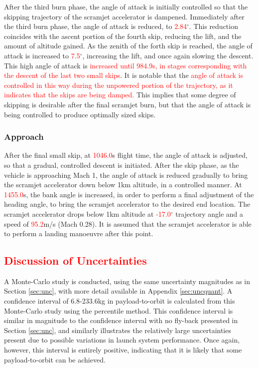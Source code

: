 After the third burn phase, the angle of attack is initially controlled so that the skipping trajectory of the scramjet accelerator is dampened.
Immediately after the third burn phase, the angle of attack is reduced, to \textcolor{red}{2.84}$^\circ$. This reduction coincides with the ascent portion of the fourth skip, reducing the lift, and the amount of altitude gained. 
As the zenith of the forth skip is reached, the angle of attack is increased to \textcolor{red}{7.5}$^\circ$, increasing the lift, and once again slowing the descent. 
This high angle of attack is \textcolor{red}{increased until 984.9s, in stages corresponding with the descent of the last two small skips}.
It is notable that the \textcolor{red}{angle of attack is controlled in this way during the unpowered portion of the trajectory, as it indicates that the skips are being damped.} This implies that some degree of skipping is desirable after the final scramjet burn, but that the angle of attack is being controlled to produce optimally sized skips. 

\subsubsection{Approach}

After the final small skip, at \textcolor{red}{1046.0}s flight time, the angle of attack is adjusted, so that a gradual, controlled descent is initiated. 
After the skip phase, as the vehicle is approaching Mach 1, the angle of attack is reduced gradually to bring the scramjet accelerator down below 1km altitude, in a controlled manner. At \textcolor{red}{1455.0}s, the bank angle is increased, in order to perform a final adjustment of the heading angle, to bring the scramjet accelerator to the desired end location. 
The scramjet accelerator drops below 1km altitude at \textcolor{red}{-17.0}$^\circ$ trajectory angle and a speed of \textcolor{red}{95.2}m/s (Mach 0.28). It is assumed that the scramjet accelerator is able to perform a landing manoeuvre after this point. 


\textcolor{red}{
	\section{Discussion of Uncertainties}}
\noindent
A Monte-Carlo study is conducted, using the same uncertainty magnitudes as in Section \ref{sec:unc}, with more detail available in Appendix \ref{sec:uncquant}. A confidence interval of 6.8-233.6kg in payload-to-orbit is calculated from this Monte-Carlo study using the percentile method. This confidence interval is similar in magnitude to the confidence interval with no fly-back presented in Section \ref{sec:unc}, and similarly illustrates the relatively large uncertainties present due to possible variations in launch system performance. Once again, however, this interval is entirely positive, indicating that it is likely that some payload-to-orbit can be achieved. 

